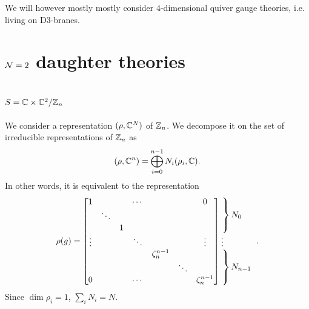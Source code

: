         We will however mostly mostly consider $4$-dimensional quiver gauge theories, i.e. living on D$3$-branes.

\section{$\mathcal{N}=2$ daughter theories}\label{sec:N2QGT}


    \subsection{$S=\mathbb{C}\times\mathbb{C}^2/\mathbb{Z}_n$}

        We consider a representation $(\rho,\mathbb{C}^N)$ of $\mathbb{Z}_n$. We decompose it on the set of irreducible representations of $\mathbb{Z}_n$ as
        \begin{equation}
            (\rho,\mathbb{C}^n)=\bigoplus^{n-1}_{i=0}N_i(\rho_i,\mathbb{C}).
        \end{equation}
        In other words, it is equivalent to the representation
        \begin{equation}
            \rho(g)=
            \begin{bmatrix}
                1 & & & \cdots & & & 0 \\
                & \ddots & & & & & \\
                & & 1 & & & &  \\
                \vdots & & & \ddots & & & \vdots \\
                & & & & \zeta^{n-1}_n & & \\
                & & & & & \ddots & \\
                0 & & & \cdots & & & \zeta^{n-1}_n 
            \end{bmatrix}
            \hspace{-0.2cm}
            \begin{tabular}{l}
            $\left.\lefteqn{\phantom{
                \begin{matrix}
                    a_0\\ \ddots\\ a_0\ 
                \end{matrix} 
            }}\right\}N_0$\\
            \vdots \\
            $\left.\lefteqn{\phantom{
                \begin{matrix}
                    b_0\\ \ddots\\ b_0\ 
                \end{matrix}
            }} \right\}N_{n-1}$
            \end{tabular}.\label{eq:reprrhoZn}
        \end{equation}
        Since $\dim\rho_i=1$, $\sum_i N_i=N$. 

